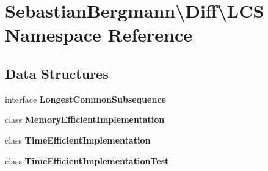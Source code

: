 \section{Sebastian\+Bergmann\textbackslash{}Diff\textbackslash{}L\+C\+S Namespace Reference}
\label{namespace_sebastian_bergmann_1_1_diff_1_1_l_c_s}
\subsection*{Data Structures}
\begin{DoxyCompactItemize}
\item 
interface {\bf Longest\+Common\+Subsequence}
\item 
class {\bf Memory\+Efficient\+Implementation}
\item 
class {\bf Time\+Efficient\+Implementation}
\item 
class {\bf Time\+Efficient\+Implementation\+Test}
\end{DoxyCompactItemize}
